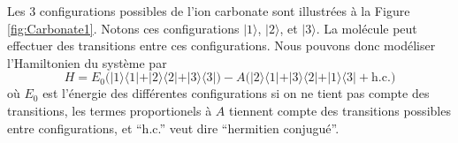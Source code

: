 Les 3 configurations possibles de l'ion carbonate sont illustrées à la Figure \ref{fig:Carbonate1}. Notons ces configurations $\vert 1 \rangle$, $\vert 2 \rangle$, et $\vert 3 \rangle$. La molécule peut effectuer des transitions entre ces configurations. Nous pouvons donc modéliser l'Hamiltonien du système par
\begin{equation}
H= E_0 \Big (\vert 1\rangle \langle 1\vert + 
\vert 2\rangle \langle 2\vert  +\vert 3\rangle \langle 3\vert  \Big)
-
A \Big( \vert 2\rangle \langle 1\vert + 
\vert 3\rangle \langle 2\vert  +\vert 1\rangle \langle 3\vert + \mathrm{h.c.} \Big)
\label{Eq:CO3}
\end{equation}
où $E_0$ est l'énergie des différentes configurations si on ne tient pas compte des transitions, les termes proportionels à $A$ tiennent compte des transitions possibles entre configurations, et ``h.c.'' veut dire ``hermitien conjugué''.
